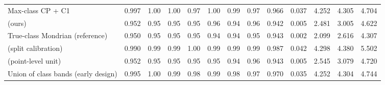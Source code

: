 \begin{table}[!htbp]
{\begin{tabular}{lcccccccccccc}
Max-class CP + C1 & 0.997 & 1.00 & 1.00 & 0.97 & 1.00 & 0.99 & 0.97 & 0.966 & 0.037 & 4.252 & 4.305 & 4.704 \\
\gamut{} (ours) & 0.952 & 0.95 & 0.95 & 0.95 & 0.96 & 0.94 & 0.96 & 0.942 & 0.005 & 2.481 & 3.005 & 4.622 \\
True-class Mondrian (reference) & 0.950 & 0.95 & 0.95 & 0.95 & 0.94 & 0.94 & 0.95 & 0.943 & 0.002 & 2.099 & 2.616 & 4.307 \\
\gamut{} (split calibration) & 0.990 & 0.99 & 0.99 & 1.00 & 0.99 & 0.99 & 0.99 & 0.987 & 0.042 & 4.298 & 4.380 & 5.502 \\
\gamut{} (point-level unit) & 0.952 & 0.95 & 0.95 & 0.95 & 0.95 & 0.94 & 0.96 & 0.943 & 0.005 & 2.545 & 3.079 & 4.720 \\
Union of class bands (early design) & 0.995 & 1.00 & 0.99 & 0.98 & 0.99 & 0.98 & 0.97 & 0.970 & 0.035 & 4.252 & 4.304 & 4.744 \\
\bottomrule
\end{tabular}}
\end{table}

